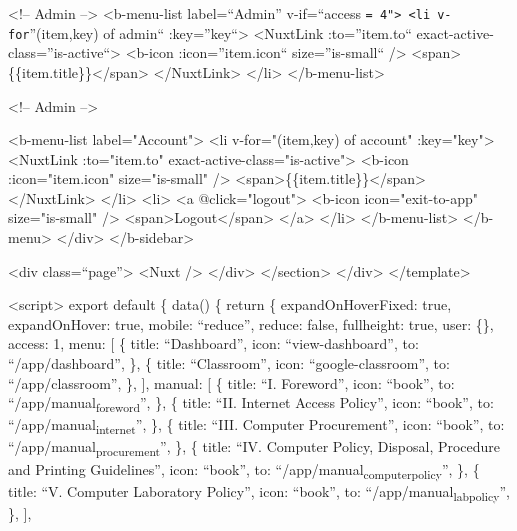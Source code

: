 \documentclass[11pt]{article}
\begin{document}
<!-- Admin -->
<b-menu-list label=``Admin'' v-if=``access \texttt{= 4">
              <li v-for}''(item,key) of admin`` :key=''key``>
    <NuxtLink :to=''item.to`` exact-active-class=''is-active``>
      <b-icon :icon=''item.icon`` size=''is-small`` />
      <span>\{\{item.title\}\}</span>
    </NuxtLink>
  </li>
</b-menu-list>

<!-- Admin -->

      <b-menu-list label="Account">
        <li v-for="(item,key) of account" :key="key">
          <NuxtLink :to="item.to" exact-active-class="is-active">
            <b-icon :icon="item.icon" size="is-small" />
            <span>\{\{item.title\}\}</span>
          </NuxtLink>
        </li>
        <li>
          <a @click="logout">
            <b-icon icon="exit-to-app" size="is-small" />
            <span>Logout</span>
          </a>
        </li>
      </b-menu-list>
    </b-menu>
  </div>
</b-sidebar>

      <div class=``page''>
        <Nuxt />
      </div>
    </section>
  </div>
</template>

<script>
export default \{
  data() \{
    return \{
      expandOnHoverFixed: true,
      expandOnHover: true,
      mobile: ``reduce'',
      reduce: false,
      fullheight: true,
      user: \{\},
      access: 1,
      menu: [
        \{
          title: ``Dashboard'',
          icon: ``view-dashboard'',
          to: ``/app/dashboard'',
        \},
        \{
          title: ``Classroom'',
          icon: ``google-classroom'',
          to: ``/app/classroom'',
        \},
      ],
      manual: [
        \{
          title: ``I. Foreword'',
          icon: ``book'',
          to: ``/app/manual\textsubscript{foreword}'',
        \},
        \{
          title: ``II. Internet Access Policy'',
          icon: ``book'',
          to: ``/app/manual\textsubscript{internet}'',
        \},
        \{
          title: ``III. Computer Procurement'',
          icon: ``book'',
          to: ``/app/manual\textsubscript{procurement}'',
        \},
        \{
          title:
            ``IV. Computer Policy, Disposal, Procedure and Printing Guidelines'',
          icon: ``book'',
          to: ``/app/manual\textsubscript{computer}\textsubscript{policy}'',
        \},
        \{
          title: ``V. Computer Laboratory Policy'',
          icon: ``book'',
          to: ``/app/manual\textsubscript{lab}\textsubscript{policy}'',
        \},
      ],
\end{document}
